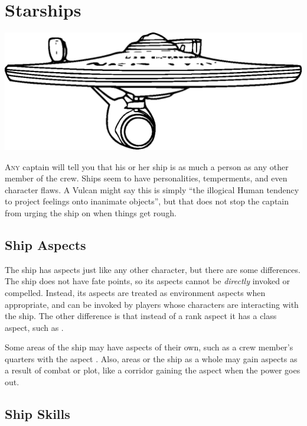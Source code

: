 \documentclass[12pt,titlepage,openany]{book}
\begin{document}
\chapter{Starships}\label{chap:starships}

\begin{center}
    \includegraphics[width=0.8\linewidth]{img/ConstitutionClass.eps}
\end{center}

\lettrine[lines=1]{A}{ny} captain will tell you that his or her ship is as much
a person as any other member of the crew. Ships seem to have personalities,
temperments, and even character flaws. A Vulcan might say this is simply ``the
illogical Human tendency to project feelings onto inanimate objects'', but that
does not stop the captain from urging the ship on when things get rough.

\section{Ship Aspects}\label{sec:ship-aspects}

The ship has aspects just like any other character, but there are some
differences. The ship does not have fate points, so its aspects cannot be
\emph{directly} invoked or compelled. Instead, its aspects are treated as
environment aspects when appropriate, and can be invoked by players whose
characters are interacting with the ship. The other difference is that instead
of a rank aspect it has a class aspect, such as .

Some areas of the ship may have aspects of their own, such as a crew member's
quarters with the aspect . Also, areas or the ship
as a whole may gain aspects as a result of combat or plot, like a corridor
gaining the aspect  when the power goes out.

\section{Ship Skills}\label{sec:ship-skills}
\end{document}
